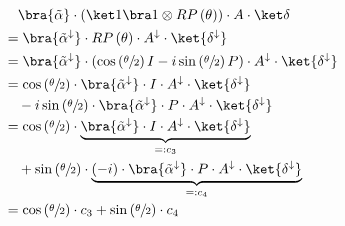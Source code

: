 \begin{equation}
    \label{eq:single-prob-simplification2}
    \begin{split}
            &\quad \bra{\tilde\alpha} \cdot (\ket 1 \bra 1 \otimes RP\left(\theta\right)) \cdot A \cdot \ket\delta \\
            &= \bra{\tilde\alpha^\downarrow} \cdot RP\left(\theta\right) \cdot A^\downarrow \cdot \ket{\delta^\downarrow} \\
            &= \bra{\tilde\alpha^\downarrow} \cdot \left(\cos\left(\sfrac\theta2\right) I - i \sin\left(\sfrac\theta2\right) P\right) \cdot A^\downarrow \cdot \ket{\delta^\downarrow} \\
            &= \cos\left(\sfrac\theta2\right) \cdot \bra{\tilde\alpha^\downarrow} \cdot I \cdot A^\downarrow \cdot \ket{\delta^\downarrow} \\
                &\quad - i \sin\left(\sfrac\theta2\right) \cdot \bra{\tilde\alpha^\downarrow} \cdot P \cdot A^\downarrow \cdot \ket{\delta^\downarrow} \\
            &= \cos\left(\sfrac\theta2\right) \cdot \underbrace{\bra{\tilde\alpha^\downarrow} \cdot I \cdot A^\downarrow \cdot \ket{\delta^\downarrow}}_{=: c_3} \\
                &\quad + \sin\left(\sfrac\theta2\right) \cdot \underbrace{\left(-i\right)\cdot \bra{\tilde\alpha^\downarrow} \cdot P \cdot A^\downarrow \cdot \ket{\delta^\downarrow}}_{=: c_4} \\
            &= \cos\left(\sfrac\theta2\right) \cdot c_3 + \sin\left(\sfrac\theta2\right) \cdot c_4
    \end{split}
\end{equation}

